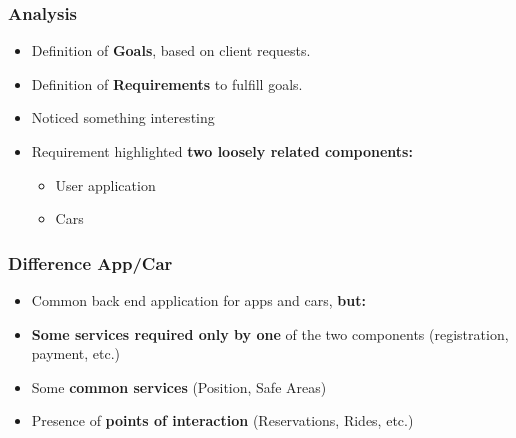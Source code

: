 \begin{frame}
    \frametitle{Analysis}
    \begin{itemize}
        \item Definition of \textbf{Goals}, based on client requests.
            \pause
        \item Definition of \textbf{Requirements} to fulfill goals.
            \pause
        \item Noticed something interesting
            \pause
        \item Requirement highlighted \textbf{two loosely related components:}
            \begin{itemize}
                \item User application
                \item Cars
            \end{itemize}
    \end{itemize}
\end{frame}

\begin{frame}
    \frametitle{Difference App/Car}
    \begin{itemize}
        \item Common back end application for apps and cars, \textbf{but:}
            \pause
        \item \textbf{Some services required only by one} of the two components (registration, payment, etc.)
            \pause
        \item Some \textbf{common services} (Position, Safe Areas)
            \pause
        \item Presence of \textbf{points of interaction} (Reservations, Rides, etc.)
    \end{itemize}
\end{frame}

